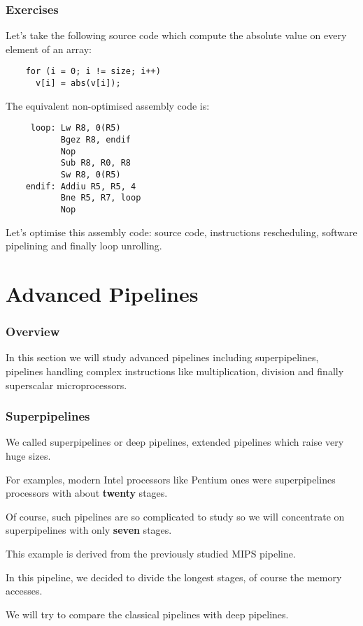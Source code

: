 
\begin{frame}[containsverbatim]
  \frametitle{Exercises}

  Let's take the following source code which compute the absolute value
  on every element of an array:

  \begin{verbatim}
    for (i = 0; i != size; i++)
      v[i] = abs(v[i]);
  \end{verbatim}

  The equivalent non-optimised assembly code is:

  \begin{verbatim}
     loop: Lw R8, 0(R5)
           Bgez R8, endif
           Nop
           Sub R8, R0, R8
           Sw R8, 0(R5)
    endif: Addiu R5, R5, 4
           Bne R5, R7, loop
           Nop
  \end{verbatim}

  Let's optimise this assembly code: source code, instructions rescheduling,
  software pipelining and finally loop unrolling.
\end{frame}

%
%

\section{Advanced Pipelines}


\begin{frame}
  \frametitle{Overview}

  In this section we will study advanced pipelines including superpipelines,
  pipelines handling complex instructions like multiplication, division
  and finally superscalar microprocessors.
\end{frame}


\begin{frame}
  \frametitle{Superpipelines}

  We called superpipelines or deep pipelines, extended pipelines which
  raise very huge sizes.

  \nl

  For examples, modern Intel processors like Pentium ones were superpipelines
  processors with about \textbf{twenty} stages.

  \nl

  Of course, such pipelines are so complicated to study so we will concentrate
  on superpipelines with only \textbf{seven} stages.

  \nl

  This example is derived from the previously studied MIPS pipeline.

  \nl

  In this pipeline, we decided to divide the longest stages, of course
  the memory accesses.

  \nl

  We will try to compare the classical pipelines with deep pipelines.
\end{frame}

